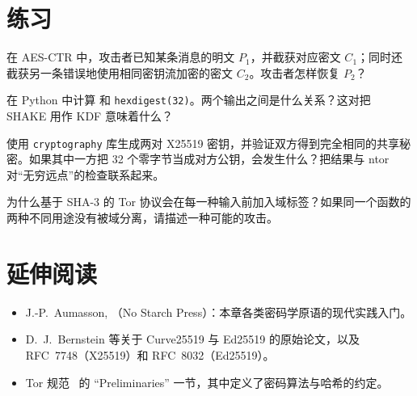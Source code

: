 \section*{练习}

\begin{esercizio}[1]\label{es:05-xor}
在 AES-CTR 中，攻击者已知某条消息的明文 $P_1$，并截获对应密文 $C_1$；同时还截获另一条错误地使用相同密钥流加密的密文 $C_2$。攻击者怎样恢复 $P_2$？
\end{esercizio}

\begin{esercizio}[1]\label{es:05-shake}
在 Python 中计算  和 \texttt{hexdigest(32)}。两个输出之间是什么关系？这对把 SHAKE 用作 KDF 意味着什么？
\end{esercizio}

\begin{esercizio}[2]\label{es:05-dh}
使用 \texttt{cryptography} 库生成两对 X25519 密钥，并验证双方得到完全相同的共享秘密。如果其中一方把 32 个零字节当成对方公钥，会发生什么？把结果与 ntor 对\enquote{无穷远点}的检查联系起来。
\end{esercizio}

\begin{esercizio}[2]\label{es:05-etichette}
为什么基于 SHA-3 的 Tor 协议会在每一种输入前加入域标签？如果同一个函数的两种不同用途没有被域分离，请描述一种可能的攻击。
\end{esercizio}

\section*{延伸阅读}
\begin{itemize}
  \item J.-P.~Aumasson, （No Starch Press）：本章各类密码学原语的现代实践入门。
  \item D.~J.~Bernstein 等关于 Curve25519 与 Ed25519 的原始论文，以及 RFC~7748（X25519）和 RFC~8032（Ed25519）。
  \item Tor 规范~\cite{torspec} 的 \enquote{Preliminaries} 一节，其中定义了密码算法与哈希的约定。
\end{itemize}
